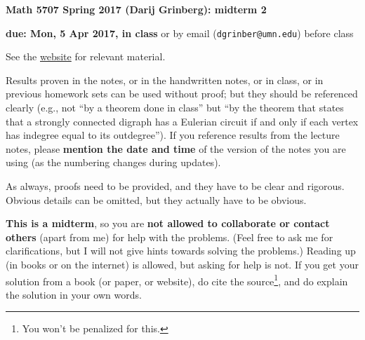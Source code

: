 \documentclass[numbers=enddot,12pt,final,onecolumn,notitlepage]{scrartcl}%
\theoremstyle{definition}
\begin{document}
\begin{center}
\textbf{Math 5707 Spring 2017 (Darij Grinberg): midterm 2}

\textbf{due: Mon, 5 Apr 2017, in class} or by email
(\texttt{dgrinber@umn.edu}) before class
\end{center}

See the \href{http://www.cip.ifi.lmu.de/~grinberg/t/17s}{website} for relevant material.

{\small Results proven in the notes, or in the handwritten notes, or in class, or in previous homework sets can be used without proof; but they should be referenced clearly (e.g., not ``by a theorem done in class'' but ``by the theorem that states that a strongly connected digraph has a Eulerian circuit if and only if each vertex has indegree equal to its outdegree'').
If you reference results from the lecture notes, please \textbf{mention the date and time} of the version of the notes you are using (as the numbering changes during updates).

As always, proofs need to be provided, and they have to be clear and rigorous. Obvious details can be omitted, but they actually have to be obvious.



\textbf{This is a midterm}, so you are \textbf{not allowed to collaborate or contact others} (apart from me) for help with the problems. (Feel free to ask me for clarifications, but I will not give hints towards solving the problems.) Reading up (in books or on the internet) is allowed, but asking for help is not. If you get your solution from a book (or paper, or website), do cite the source\footnote{You won't be penalized for this.}, and do explain the solution in your own words. }
\end{document}
